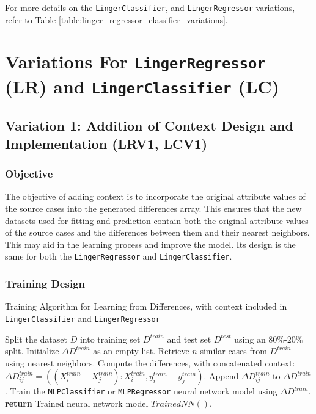 \documentclass[a4paper, 12pt]{report}
\begin{document}
For more details on the \texttt{LingerClassifier}, and \texttt{LingerRegressor} variations, refer to Table \ref{table:linger_regressor_classifier_variations}.
\section{Variations For \texttt{LingerRegressor} (LR) and \texttt{LingerClassifier} (LC)}
\subsection{Variation 1: Addition of Context Design and Implementation (LRV1, LCV1)}
\label{sec:linger_regr_class_variation1_model}

\subsubsection{Objective}
The objective of adding context is to incorporate the original attribute values of the source cases into the generated differences array. 
This ensures that the new datasets used for fitting and prediction contain both the original attribute values of the source cases and the differences between them and their nearest neighbors. 
This may aid in the learning process and improve the model. Its design is the same for both the \texttt{LingerRegressor} and \texttt{LingerClassifier}.

\subsubsection{Training Design}
\begin{algorithm}[H]
    \caption{Training Algorithm for Learning from Differences, with context included in \texttt{LingerClassifier} and \texttt{LingerRegressor}}
    \label{alg:training_variant_1_linger}
    \begin{algorithmic}[1]
        \State Split the dataset $D$ into training set $D^{train}$ and test set $D^{test}$ using an $80\%$-$20\%$ split.
        \State Initialize $\Delta D^{train}$ as an empty list.
            \State Retrieve $n$ similar cases from $D^{train}$ using nearest neighbors.
                \State Compute the differences, with concatenated context: $\Delta D^{train}_{ij} = ((X^{train}_i - X^{train}_j):X^{train}_i, y^{train}_i - y^{train}_j)$.
                \State Append $\Delta D^{train}_{ij}$ to $\Delta D^{train}$.
            \EndFor
        \EndFor
        \State Train the \texttt{MLPClassifier} or \texttt{MLPRegressor} neural network model using $\Delta D^{train}$.
        \State \textbf{return} Trained neural network model $Trained NN()$.
    \end{algorithmic}
\end{algorithm}
\end{document}
